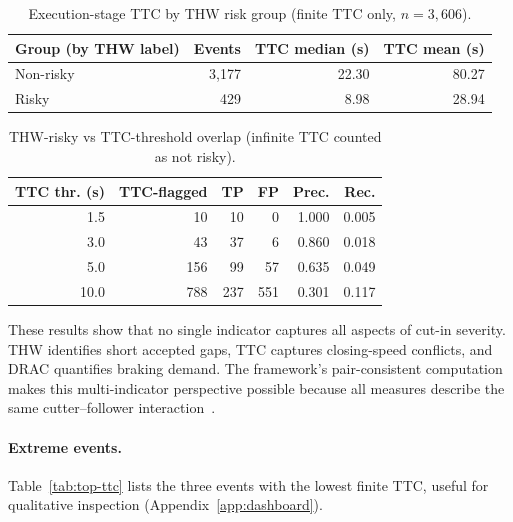 \documentclass[12pt,a4paper,twoside,openright]{report}
\begin{document}
    \begin{table}[H]
        \centering
        \caption{Execution-stage TTC by THW risk group (finite TTC only, $n=3{,}606$).}
        \label{tab:ttc-finite}
        \begin{tabular}{@{}lrrr@{}}
            \toprule
            Group (by THW label) & Events & TTC median (s) & TTC mean (s) \\
            \midrule
            Non-risky & 3,177 & 22.30 & 80.27 \\
            Risky & 429 & 8.98 & 28.94 \\
            \bottomrule
        \end{tabular}
    \end{table}

    \begin{table}[H]
        \centering
        \caption{THW-risky vs TTC-threshold overlap (infinite TTC counted as not risky).}
        \label{tab:ttc-thw-overlap}
        \begin{tabular}{@{}rrrrrr@{}}
            \toprule
            TTC thr. (s) & TTC-flagged & TP & FP & Prec. & Rec. \\
            \midrule
            1.5 & 10 & 10 & 0 & 1.000 & 0.005 \\
            3.0 & 43 & 37 & 6 & 0.860 & 0.018 \\
            5.0 & 156 & 99 & 57 & 0.635 & 0.049 \\
            10.0 & 788 & 237 & 551 & 0.301 & 0.117 \\
            \bottomrule
        \end{tabular}
    \end{table}

    These results show that no single indicator captures all aspects of cut-in severity. THW identifies short accepted gaps, TTC captures closing-speed conflicts, and DRAC quantifies braking demand. The framework's pair-consistent computation makes this multi-indicator perspective possible because all measures describe the same cutter--follower interaction~\cite{zhou2016riskperception,wang2021ssm}.

    \paragraph{Extreme events.}
    Table~\ref{tab:top-ttc} lists the three events with the lowest finite TTC, useful for qualitative inspection (Appendix~\ref{app:dashboard}).
\end{document}
